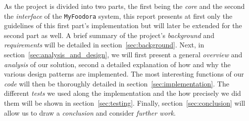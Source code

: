 As the project is divided into two parts, the first being the \emph{core}
and the second the \emph{interface} of the \lstinline|MyFoodora| system,
this report presents at first only the guidelines of this first part's implementation but will later 
be extended for the second part as well.
A brief summary of the project's \emph{background} and \emph{requirements} will
be detailed in section~\ref{sec:background}.
Next, in section~\ref{sec:analysis_and_design}, we will first present
a general \emph{overview} and \emph{analysis} of our solution, second a detailed 
explanation of how and why the various design patterns are implemented.
The most interesting functions of our \emph{code} will then be
thoroughly detailed in section~\ref{sec:implementation}.
The different \emph{tests} we used along the implementation
and the how precisely we did them will
be shown in section~\ref{sec:testing}.
Finally, section~\ref{sec:conclusion} will allow us to draw 
a \emph{conclusion} and consider \emph{further work}.

